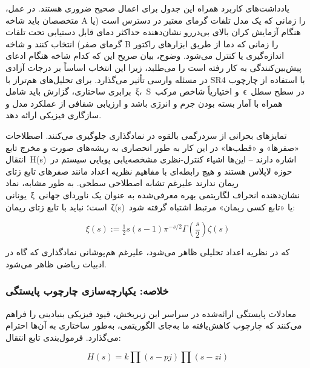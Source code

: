 \documentclass[12pt, a4paper]{article}
\begin{document}
یادداشت‌های کاربرد همراه این جدول برای اعمال صحیح ضروری هستند. در عمل، متخصصان باید شاخه A را زمانی که یک مدل تلفات گرمای معتبر در دسترس است (یا هنگام آزمایش کران بالای بی‌دررو نشان‌دهنده حداکثر دمای قابل دستیابی تحت تلفات گرمای صفر) انتخاب کنند و شاخه B را زمانی که دما از طریق ابزارهای راکتور اندازه‌گیری یا کنترل می‌شود. وضوح، بیان صریح این که کدام شاخه هنگام ادعای پیش‌بین‌کنندگی به کار رفته است را می‌طلبد، زیرا این انتخاب اساساً بر درجات آزادی در مسئله وارسی تأثیر می‌گذارد. برای تحلیل‌های هم‌تراز با SR4 با استفاده از چارچوب برابری ساختاری، گزارش باید شامل ξ، S و اختیاریاً شاخص مرکب ϵ در سطح سطل همراه با آمار بسته بودن جرم و انرژی باشد و ارزیابی شفافی از عملکرد مدل و سازگاری فیزیکی ارائه دهد.

تمایزهای بحرانی از سردرگمی بالقوه در نمادگذاری جلوگیری می‌کنند. اصطلاحات «صفرها» و «قطب‌ها» در این کار به طور انحصاری به ریشه‌های صورت و مخرج تابع انتقال H(s) اشاره دارند – این‌ها اشیاء کنترل-نظری مشخصه‌یابی پویایی سیستم در حوزه لاپلاس هستند و هیچ رابطه‌ای با مفاهیم نظریه اعداد مانند صفرهای تابع زتای ریمان ندارند علیرغم تشابه اصطلاحی سطحی. به طور مشابه، نماد یونانی ξ نشان‌دهنده انحراف لگاریتمی بهره معرفی‌شده به عنوان یک ناوردای جهانی است؛ نباید با تابع زتای ریمان ζ(s) یا «تابع کسی ریمان» مرتبط اشتباه گرفته شود:

\begin{equation}
\xi(s):=\tfrac{1}{2}s(s-1)\pi^{-s/2}\Gamma\!\left(\frac{s}{2}\right)\zeta(s)
\end{equation}

که در نظریه اعداد تحلیلی ظاهر می‌شود، علیرغم هم‌پوشانی نمادگذاری که گاه در ادبیات ریاضی ظاهر می‌شود.

\subsubsection{خلاصه: یکپارچه‌سازی چارچوب پایستگی}

معادلات پایستگی ارائه‌شده در سراسر این زیربخش، قیود فیزیکی بنیادینی را فراهم می‌کنند که چارچوب کاهش‌یافته ما به‌جای الگوریتمی، به‌طور ساختاری به آن‌ها احترام می‌گذارد. فرمول‌بندی تابع انتقال:

\begin{equation}
H(s)=k\prod(s-pj)\prod(s-zi)
\end{equation}
\end{document}

